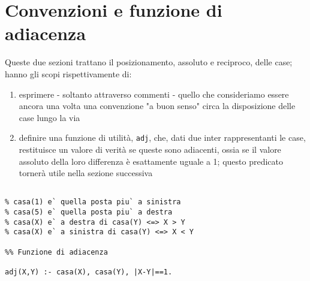 \section{Convenzioni e funzione di adiacenza}
Queste due sezioni trattano il posizionamento, assoluto e reciproco, delle case; hanno gli scopi rispettivamente di: \begin{enumerate} \item{esprimere - soltanto attraverso commenti - quello che consideriamo essere ancora una volta una convenzione "a buon senso" circa la disposizione delle case lungo la via} \item{definire una funzione di utilità, \texttt{adj}, che, dati due inter rappresentanti le case, restituisce un valore di verità se queste sono adiacenti, ossia se il valore assoluto della loro differenza è esattamente uguale a 1; questo predicato tornerà utile nella sezione successiva} \end{enumerate}
\begin{lstlisting}[frame=tb]
%% Convenzioni

% casa(1) e` quella posta piu` a sinistra
% casa(5) e` quella posta piu` a destra
% casa(X) e` a destra di casa(Y) <=> X > Y
% casa(X) e` a sinistra di casa(Y) <=> X < Y

%% Funzione di adiacenza

adj(X,Y) :- casa(X), casa(Y), |X-Y|==1.
\end{lstlisting}
